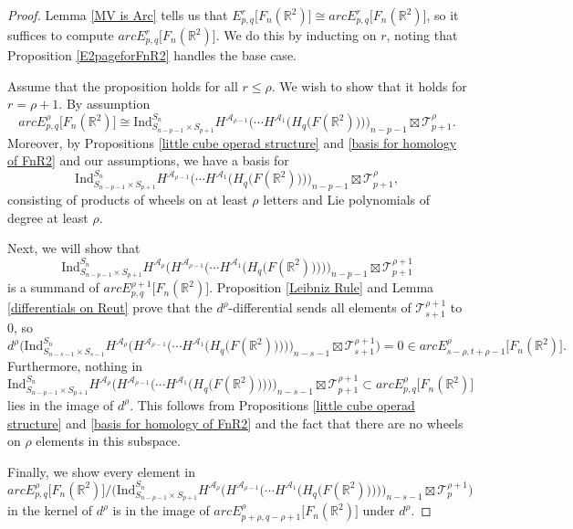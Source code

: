 \documentclass[pagebackref,colorlinks,citecolor=blue,linkcolor=blue,urlcolor=blue,filecolor=blue]{article}
\theoremstyle{definition}\newtheorem{definition}[thm]{Definition}
\theoremstyle{definition}
\newcommand{\R}{\ensuremath{\mathbb{R}}}
\begin{document}
\begin{proof}
Lemma \ref{MV is Arc} tells us that $E^{r}_{p,q}\big[F_{n}(\R^{2})\big]\cong arcE^{r}_{p,q}\big[F_{n}(\R^{2})\big]$, so it suffices to compute $arcE^{r}_{p,q}\big[F_{n}(\R^{2})\big]$.
We do this by inducting on $r$, noting that Proposition \ref{E2pageforFnR2} handles the base case.

Assume that the proposition holds for all $r\le \rho$.
We wish to show that it holds for $r=\rho+1$.
By assumption
\[
arcE^{\rho}_{p,q}\big[F_{n}(\R^{2})\big]\cong \text{Ind}^{S_{n}}_{S_{n-p-1}\times S_{p+1}}H^{\mathcal{A}_{\rho-1}}\bigg(\cdots H^{\mathcal{A}_{1}}\Big(H_{q}\big(F(\R^{2})\big)\Big)\bigg)_{n-p-1}\boxtimes \mathcal{T}^{\rho}_{p+1}.
\]
Moreover, by Propositions \ref{little cube operad structure} and \ref{basis for homology of FnR2} and our assumptions, we have a basis for
\[
\text{Ind}^{S_{n}}_{S_{n-p-1}\times S_{p+1}}H^{\mathcal{A}_{\rho-1}}\bigg(\cdots H^{\mathcal{A}_{1}}\Big(H_{q}\big(F(\R^{2})\big)\Big)\bigg)_{n-p-1}\boxtimes \mathcal{T}^{\rho}_{p+1},
\]
consisting of products of wheels on at least $\rho$ letters and Lie polynomials of degree at least $\rho$.

Next, we will show that
\[
\text{Ind}^{S_{n}}_{S_{n-p-1}\times S_{p+1}}
H^{\mathcal{A}_{\rho}}\Bigg(
H^{\mathcal{A}_{\rho-1}}\bigg(\cdots H^{\mathcal{A}_{1}}\Big(H_{q}\big(F(\R^{2})\big)\Big)\bigg)\Bigg)_{n-p-1}\boxtimes \mathcal{T}^{\rho+1}_{p+1}
\]
is a summand of $arcE^{\rho+1}_{p,q}\big[F_{n}(\R^{2})\big]$.
Proposition \ref{Leibniz Rule} and Lemma \ref{differentials on Reut} prove that the $d^{\rho}$-differential sends all elements of $\mathcal{T}^{\rho+1}_{s+1}$ to $0$, so 
\[
d^{\rho}\Bigg(\text{Ind}^{S_{n}}_{S_{n-s-1}\times S_{s-1}}
H^{\mathcal{A}_{\rho}}\Bigg(
H^{\mathcal{A}_{\rho-1}}\bigg(\cdots H^{\mathcal{A}_{1}}\Big(H_{q}\big(F(\R^{2})\big)\Big)\bigg)\Bigg)_{n-s-1}\boxtimes \mathcal{T}^{\rho+1}_{s+1}\Bigg)=0\in arcE^{\rho}_{s-\rho, t+\rho-1}\big[F_{n}(\R^{2})\big].
\]
Furthermore, nothing in
\[
\text{Ind}^{S_{n}}_{S_{n-p-1}\times S_{p+1}}
H^{\mathcal{A}_{\rho}}\Bigg(
H^{\mathcal{A}_{\rho-1}}\bigg(\cdots H^{\mathcal{A}_{1}}\Big(H_{q}\big(F(\R^{2})\big)\Big)\bigg)\Bigg)_{n-s-1}\boxtimes \mathcal{T}^{\rho+1}_{p+1}\subset arcE^{\rho}_{p,q}\big[F_{n}(\R^{2})\big]
\]
lies in the image of $d^{\rho}$.
This follows from Propositions \ref{little cube operad structure} and \ref{basis for homology of FnR2} and the fact that there are no wheels on $\rho$ elements in this subspace.

Finally, we show every element in
\[
arcE^{\rho}_{p,q}\big[F_{n}(\R^{2})\big]/\Bigg(\text{Ind}^{S_{n}}_{S_{n-p-1}\times S_{p+1}}
H^{\mathcal{A}_{\rho}}\Bigg(
H^{\mathcal{A}_{\rho-1}}\bigg(\cdots H^{\mathcal{A}_{1}}\Big(H_{q}\big(F(\R^{2})\big)\Big)\bigg)\Bigg)_{n-s-1}\boxtimes \mathcal{T}^{\rho+1}_{p}\Bigg)
\]
in the kernel of $d^{\rho}$ is in the image of $arcE^{\rho}_{p+\rho, q-\rho+1}\big[F_{n}(\R^{2})\big]$ under $d^{\rho}$.


\end{proof}
\end{document}
